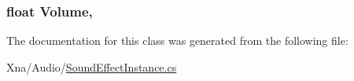 \subsubsection[{Volume}]{\setlength{\rightskip}{0pt plus 5cm}float Volume\hspace{0.3cm}{\ttfamily [get]}, {\ttfamily [set]}}\label{classMicrosoft_1_1Xna_1_1Framework_1_1Audio_1_1SoundEffectInstance_a3383a6f06762b723a31e32c6878fe826}


The documentation for this class was generated from the following file\+:\begin{DoxyCompactItemize}
\item 
Xna/\+Audio/\hyperlink{SoundEffectInstance_8cs}{Sound\+Effect\+Instance.\+cs}\end{DoxyCompactItemize}
